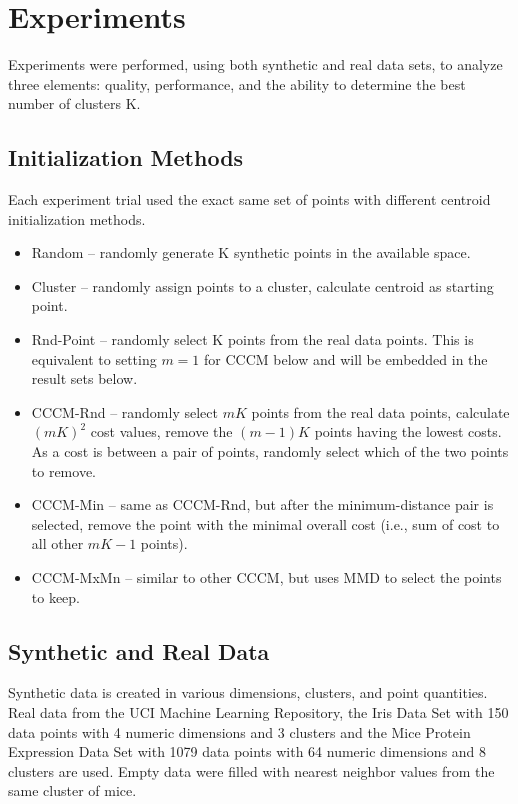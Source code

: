 \documentclass{article}
\begin{document}
\section{Experiments}
\label{experiments}

Experiments were performed, using both synthetic and real data sets, to analyze three elements: quality, performance, and the ability to determine the best number of clusters K.

\subsection{Initialization Methods}

Each experiment trial used the exact same set of points with different centroid initialization methods.

\begin{itemize}
\item Random \cite{jancey} – randomly generate K synthetic points in the available space.
\item Cluster \cite{forgy} – randomly assign points to a cluster, calculate centroid as starting point.
\item Rnd-Point \cite{macqueen} – randomly select K points from the real data points.  This is equivalent to setting $m=1$ for CCCM below and will be embedded in the result sets below.
\item CCCM-Rnd – randomly select $mK$ points from the real data points, calculate $(mK)^2$ cost values, remove the $(m-1)K$ points having the lowest costs.  As a cost is between a pair of points, randomly select which of the two points to remove.
\item CCCM-Min – same as CCCM-Rnd, but after the minimum-distance pair is selected, remove the point with the minimal overall cost (i.e., sum of cost to all other $mK-1$ points).
\item CCCM-MxMn – similar to other CCCM, but uses MMD to select the points to keep.
\end{itemize}

\subsection{Synthetic and Real Data}

Synthetic data is created in various dimensions, clusters, and point quantities.  Real data from the UCI Machine Learning Repository, the Iris Data Set \cite{UCIIris} with 150 data points with 4 numeric dimensions and 3 clusters and the Mice Protein Expression Data Set \cite{UCIMice} with 1079 data points with 64 numeric dimensions and 8 clusters are used.  Empty data were filled with nearest neighbor values from the same cluster of mice.
\end{document}
